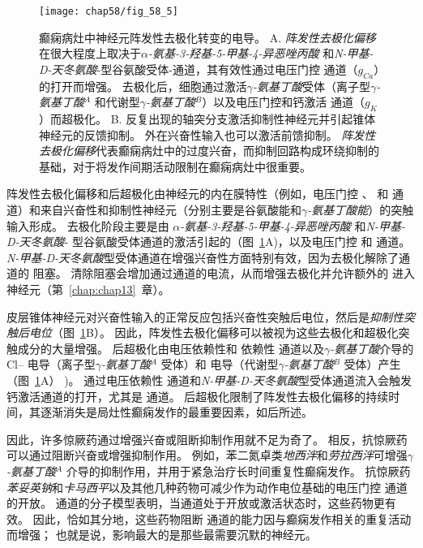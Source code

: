 \begin{figure}[htbp]
	\centering
	\texttt{[image: chap58/fig\_58\_5]}
	\caption{癫痫病灶中神经元阵发性去极化转变的电导。
		A. \textit{阵发性去极化偏移}在很大程度上取决于\textit{$\alpha$-氨基-3-羟基-5-甲基-4-异恶唑丙酸} 和\textit{N-甲基-D-天冬氨酸}-型谷氨酸受体-通道，其有效性通过电压门控  通道（$ g_{Ca} $）的打开而增强。
		去极化后，细胞通过激活\textit{$\gamma$-氨基丁酸}受体（离子型\textit{$\gamma$-氨基丁酸}$^A$ 和代谢型\textit{$\gamma$-氨基丁酸}$^B$）以及电压门控和钙激活  通道（$ g_K $）而超极化\cite{lothman1993neurobiology}。
		B. 反复出现的轴突分支激活抑制性神经元并引起锥体神经元的反馈抑制。
		外在兴奋性输入也可以激活前馈抑制。
		\textit{阵发性去极化偏移}代表癫痫病灶中的过度兴奋，而抑制回路构成环绕抑制的基础，对于将发作间期活动限制在癫痫病灶中很重要。}
	\label{fig:58_5}
\end{figure}


阵发性去极化偏移和后超极化由神经元的内在膜特性（例如，电压门控 、 和  通道）和来自兴奋性和抑制性神经元（分别主要是谷氨酸能和\textit{$\gamma$-氨基丁酸能}）的突触输入形成。
去极化阶段主要是由 \textit{$\alpha$-氨基-3-羟基-5-甲基-4-异恶唑丙酸} 和\textit{N-甲基-D-天冬氨酸}- 型谷氨酸受体通道的激活引起的（图~\ref{fig:58_5}A)，以及电压门控  和  通道。
\textit{N-甲基-D-天冬氨酸}型受体通道在增强兴奋性方面特别有效，因为去极化解除了通道的  阻塞。
清除阻塞会增加通过通道的电流，从而增强去极化并允许额外的  进入神经元（第~\ref{chap:chap13}~章）。


皮层锥体神经元对兴奋性输入的正常反应包括兴奋性突触后电位，然后是\textit{抑制性突触后电位}（图~\ref{fig:58_5}B）。
因此，阵发性去极化偏移可以被视为这些去极化和超极化突触成分的大量增强。
后超极化由电压依赖性和  依赖性  通道以及\textit{$\gamma$-氨基丁酸}介导的 Cl– 电导（离子型\textit{$\gamma$-氨基丁酸}$^A$ 受体）和  电导（代谢型\textit{$\gamma$-氨基丁酸}$^B$ 受体）产生（图~\ref{fig:58_5}A） )。
 通过电压依赖性  通道和\textit{N-甲基-D-天冬氨酸}型受体通道流入会触发钙激活通道的打开，尤其是  通道。
后超极化限制了阵发性去极化偏移的持续时间，其逐渐消失是局灶性癫痫发作的最重要因素，如后所述。


因此，许多惊厥药通过增强兴奋或阻断抑制作用就不足为奇了。
相反，抗惊厥药可以通过阻断兴奋或增强抑制作用。 例如，苯二氮卓类\textit{地西泮}和\textit{劳拉西泮}可增强\textit{$\gamma$-氨基丁酸}$^A$ 介导的抑制作用，并用于紧急治疗长时间重复性癫痫发作。
抗惊厥药\textit{苯妥英钠}和\textit{卡马西平}以及其他几种药物可减少作为动作电位基础的电压门控  通道的开放。
 通道的分子模型表明，当通道处于开放或激活状态时，这些药物更有效。
因此，恰如其分地，这些药物阻断  通道的能力因与癫痫发作相关的重复活动而增强；
也就是说，影响最大的是那些最需要沉默的神经元。



